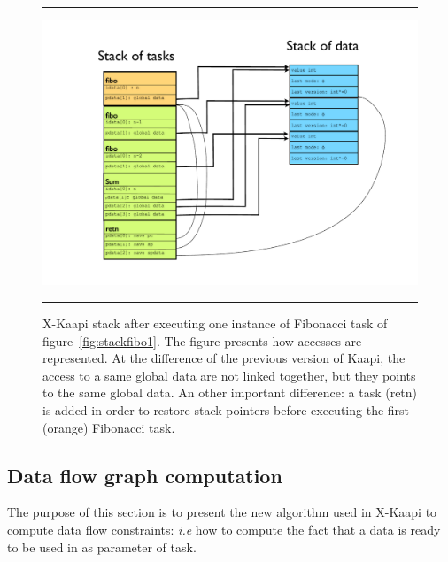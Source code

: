\documentclass{report}
\newcommand{\kaapi}{\textsc{X}-Kaapi\xspace}
\begin{document}
\begin{figure}[!h]
\hrule
\hspace*{-5ex}
\begin{minipage}[t]{1\linewidth}
\begin{center}
\includegraphics[width=1.0\linewidth]{stackfibo2}
\end{center}
\end{minipage}
\hrule
\caption{\kaapi stack after executing one instance of Fibonacci task of figure~\ref{fig:stackfibo1}.
The figure presents how accesses are represented. At the difference of the previous version of Kaapi,
the access to a same global data are not linked together, but they points to the same global data.
An other important difference: a task (retn) is added in order to restore stack pointers before executing the first (orange)  Fibonacci task.
}
\label{fig:stackfibo2}
\end{figure}


\newpage
\subsection{Data flow graph computation}
The purpose of this section is to present the new algorithm used in \kaapi to compute data flow constraints: \textit{i.e} how to compute the fact that a data is ready to be used in as parameter of task.
\end{document}
